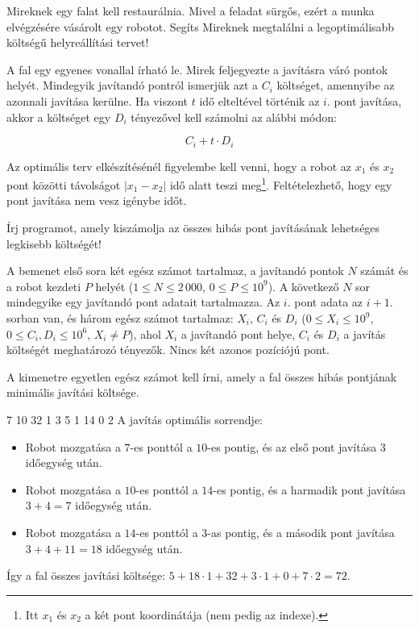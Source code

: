 





Mireknek egy falat kell restaurálnia. Mivel a feladat sürgős, ezért a munka elvégzésére vásárolt egy robotot. Segíts Mireknek megtalálni a legoptimálisabb költségű helyreállítási tervet!

A fal egy egyenes vonallal írható le. Mirek feljegyezte a javításra váró pontok helyét. Mindegyik javítandó pontról ismerjük azt a $C_i$ költséget, amennyibe az azonnali javítása kerülne. Ha viszont $t$ idő elteltével történik az $i$. pont javítása, akkor a költséget egy $D_i$ tényezővel kell számolni az alábbi módon: 

\[ C_i + t \cdot D_i \]

Az optimális terv elkészítésénél figyelembe kell venni, hogy a robot az $x_1$ és $x_2$ pont közötti távolságot $|x_1 - x_2|$ idő alatt teszi meg\footnote{Itt $x_1$ és $x_2$ a két pont koordinátája (nem pedig az indexe).}. Feltételezhető, hogy egy pont javítása nem vesz igénybe időt.


Írj programot, amely kiszámolja az összes hibás pont javításának lehetséges legkisebb költségét!


A bemenet első sora két egész számot tartalmaz, a javítandó pontok $N$ számát és a robot kezdeti $P$ helyét ($1 \le N \le 2\,000$, $0 \le P \le 10^9$).
A következő $N$ sor mindegyike egy javítandó pont adatait tartalmazza. Az $i$. pont adata az $i+1$. sorban van, és három egész számot tartalmaz: $X_i$, $C_i$ és $D_i$ ($0 \le X_i \le 10^9$, $0 \le C_i, D_i \le 10^6$, $X_i \neq P$), ahol $X_i$ a javítandó pont helye, $C_i$ és $D_i$ a javítás költségét meghatározó tényezők. Nincs két azonos pozíciójú pont.


A kimenetre egyetlen egész számot kell írni, amely a fal összes hibás pontjának minimális javítási költsége.



 7
10 32 1
3 5 1
14 0 2
\sampleCOMMENT
A javítás optimális sorrendje:
\begin{itemize}
	\item Robot mozgatása a $7$-es ponttól a $10$-es pontig, és az első pont javítása $3$ időegység után.
	\item Robot mozgatása a $10$-es ponttól a $14$-es pontig, és a harmadik pont javítása $3 + 4 = 7$ időegység után.
	\item Robot mozgatása a $14$-es ponttól a $3$-as pontig, és a második pont javítása $3 + 4 + 11 = 18$ időegység után.
\end{itemize}
Így a fal összes javítási költsége: $5 + 18 \cdot 1 + 32 + 3 \cdot 1 + 0 + 7 \cdot 2 = 72$.
\sampleEND



